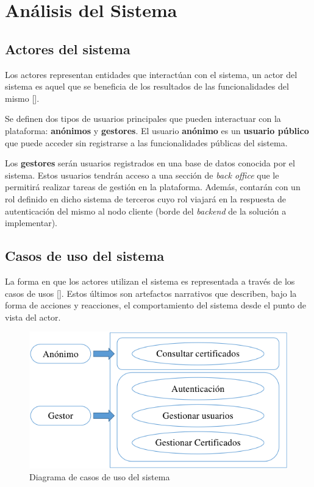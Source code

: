 \section{Análisis del Sistema}

\subsection{Actores del sistema}
Los actores representan entidades que interactúan con el sistema, un actor del sistema es aquel que se beneficia de los resultados de las funcionalidades del mismo [\cite{91}]. 

Se definen dos tipos de usuarios principales que pueden interactuar con la plataforma: \textbf{anónimos} y \textbf{gestores}. El usuario \textbf{anónimo} es un \textbf{usuario público} que puede acceder sin registrarse a las funcionalidades públicas del sistema.

Los \textbf{gestores} serán usuarios registrados en una base de datos conocida por el sistema. Estos usuarios tendrán acceso a una sección de \textit{back office} que le permitirá realizar tareas de gestión en la plataforma. Además, contarán con un rol definido en dicho sistema de terceros cuyo rol viajará en la respuesta de autenticación del mismo al nodo cliente (borde del \textit{backend} de la solución a implementar).

\subsection{Casos de uso del sistema}
La forma en que los actores utilizan el sistema es representada a través de los casos de usos [\cite{91}]. Estos últimos son artefactos narrativos que describen, bajo la forma de acciones y reacciones, el comportamiento del sistema desde el punto de vista del actor.

\begin{figure}[!h]
	\centering
	\includegraphics[width=\linewidth]{Graphics/caso-uso.png}
	\caption{Diagrama de casos de uso del sistema}
	\label{fig:11}
\end{figure}


